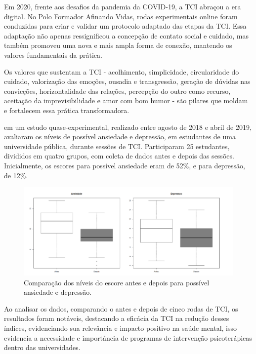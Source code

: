         Em 2020, frente aos desafios da pandemia da COVID-19, a TCI abraçou a era digital. No Polo Formador Afinando Vidas, rodas experimentais online foram conduzidas para criar e validar um protocolo adaptado das etapas da TCI. Essa adaptação não apenas ressignificou a concepção de contato social e cuidado, mas também promoveu uma nova e mais ampla forma de conexão, mantendo os valores fundamentais da prática. \cite{SILVAeOTAVIANO}
        
        Os valores que sustentam a TCI - acolhimento, simplicidade, circularidade do cuidado, valorização das emoções, ousadia e transgressão, geração de dúvidas nas convicções, horizontalidade das relações, percepção do outro como recurso, aceitação da imprevisibilidade e amor com bom humor - são pilares que moldam e fortalecem essa prática transformadora.\cite{SILVA}
        
        \cite{BOARETTO} em um estudo quase-experimental, realizado entre agosto de 2018 e abril de 2019, avaliaram os níveis de possível ansiedade e depressão, em estudantes de uma universidade pública, durante sessões de TCI. Participaram 25 estudantes, divididos em quatro grupos, com coleta de dados antes e depois das sessões. Inicialmente, os escores para possível ansiedade eram de 52\%, e para depressão, de 12\%.
        
            \begin{figure}[!h] %
                \centering
                \includegraphics[scale=0.5]{latex/figuras/boaretto.pdf}
                \caption[Níveis de Ansiedade e Depressão]%
                {Comparação dos níveis do escore antes e depois para possível ansiedade e depressão. \cite{BOARETTO}}%
            \end{figure}
        
        Ao analisar os dados, comparando o antes e depois de cinco rodas de TCI, os resultados foram notáveis, destacando a eficácia da TCI na redução desses índices, evidenciando sua relevância e impacto positivo na saúde mental, isso evidencia a necessidade e importância de programas de intervenção psicoterápicas dentro das universidades.\cite{BOARETTO}
        
